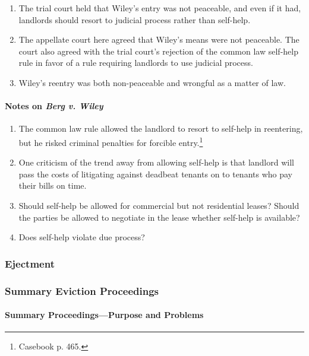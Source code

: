 \begin{enumerate}
\begin{enumerate}
\begin{enumerate}
            \item The trial court held that Wiley's entry was not peaceable, 
            and even if it had, landlords should resort to judicial process 
            rather than self-help.
            \item The appellate court here agreed that Wiley's means were not 
            peaceable. The court also agreed with the trial court's rejection 
            of the common law self-help rule in favor of a rule requiring 
            landlords to use judicial process.
            \item Wiley's reentry was both non-peaceable and wrongful as a 
            matter of law.
        \end{enumerate}
    \end{enumerate}
\end{enumerate}

\paragraph{Notes on \emph{Berg v. Wiley}}

\begin{enumerate}
    \item The common law rule allowed the landlord to resort to self-help in 
    reentering, but he risked criminal penalties for forcible 
    entry.\footnote{Casebook p. 465.}
    \item One criticism of the trend away from allowing self-help is that 
    landlord will pass the costs of litigating against deadbeat tenants on to 
    tenants who pay their bills on time.
    \item Should self-help be allowed for commercial but not residential 
    leases? Should the parties be allowed to negotiate in the lease whether 
    self-help is available?
    \item Does self-help violate due process?
\end{enumerate}

\subsubsection{Ejectment} %

\subsubsection{Summary Eviction Proceedings} %

\paragraph{Summary Proceedings---Purpose and Problems}

